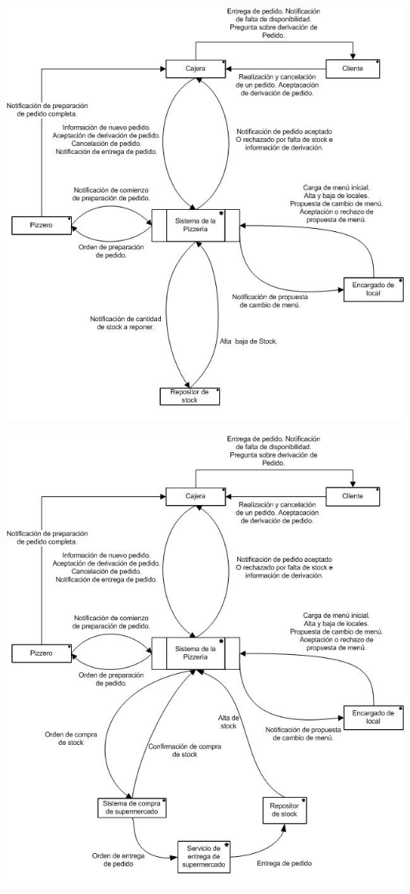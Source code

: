 \documentclass[a4paper,11pt] {article}
\begin{document}
\begin{center}
 \includegraphics{Diagramas/Diagramadecontexto.jpg}
\end{center}
\begin{center}
 \includegraphics{Diagramas/Diagramadecontextoconstockautomatico.jpg}
\end{center}
\end{document}
